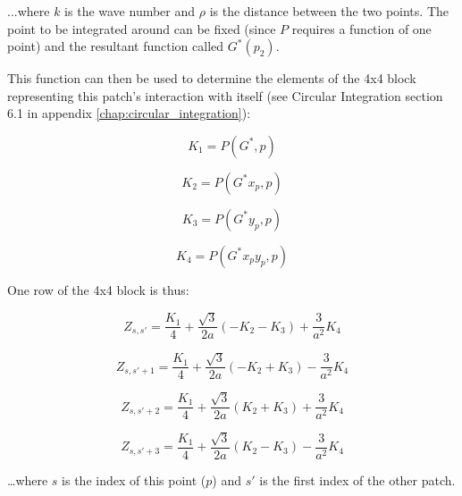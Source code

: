 \documentclass[etd,twoside,senior,noacknowledgments]{BYUPhys}
\begin{document}
...where $k$ is the wave number and $\rho$ is the distance between the two points. The point to be integrated around can be fixed (since $P$ requires a function of one point) and the resultant function called $G^{*}\left(p_{2}\right)$.

This function can then be used to determine the elements of the 4x4 block representing this patch's interaction with itself (see Circular Integration section 6.1 in appendix \ref{chap:circular_integration}):

\begin{equation}
  K_{1}=P\left(G^{*},p\right)
\end{equation}

\begin{equation}
  K_{2}=P\left(G^{*}x_{p},p\right)
\end{equation}

\begin{equation}
  K_{3}=P\left(G^{*}y_{p},p\right)
\end{equation}

\begin{equation}
  K_{4}=P\left(G^{*}x_{p}y_{p},p\right)
\end{equation}

One row of the 4x4 block is thus:

\begin{equation}
  Z_{s,s'}=\frac{K_{1}}{4}+\frac{\sqrt{3}}{2a}\left(-K_{2}-K_{3}\right)+\frac{3}{a^{2}}K_{4}
\end{equation}

\begin{equation}
  Z_{s,s'+1}=\frac{K_{1}}{4}+\frac{\sqrt{3}}{2a}\left(-K_{2}+K_{3}\right)-\frac{3}{a^{2}}K_{4}
\end{equation}

\begin{equation}
  Z_{s,s'+2}=\frac{K_{1}}{4}+\frac{\sqrt{3}}{2a}\left(K_{2}+K_{3}\right)+\frac{3}{a^{2}}K_{4}
\end{equation}

\begin{equation}
  Z_{s,s'+3}=\frac{K_{1}}{4}+\frac{\sqrt{3}}{2a}\left(K_{2}-K_{3}\right)-\frac{3}{a^{2}}K_{4}
\end{equation}

\ldots where $s$ is the index of this point ($p$) and $s'$ is the first index of the other patch.

\end{document}
